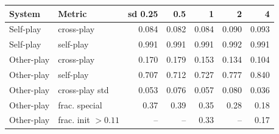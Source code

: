 \begin{tabular}{llrrrrr}\toprule
System & Metric & sd 0.25 & 0.5 & 1 & 2 & 4 \\ \midrule
Self-play & cross-play & 0.084 & 0.082 & 0.084 & 0.090 & 0.093 \\
Self-play & self-play & 0.991 & 0.991 & 0.991 & 0.992 & 0.991 \\
Other-play & cross-play & 0.170 & 0.179 & 0.153 & 0.134 & 0.104 \\
Other-play & self-play & 0.707 & 0.712 & 0.727 & 0.777 & 0.840 \\
Other-play & cross-play std & 0.053 & 0.076 & 0.057 & 0.080 & 0.036 \\
Other-play & frac. special & 0.37 & 0.39 & 0.35 & 0.28 & 0.18 \\
Other-play & frac. init $>0.11$ & -- & -- & 0.33 & -- & 0.17 \\
\bottomrule\end{tabular}